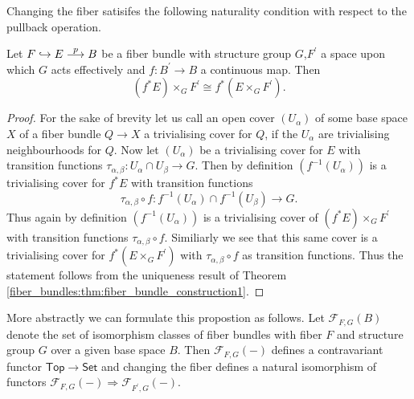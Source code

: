    Changing the fiber satisifes the following naturality condition with respect to the pullback operation. 
    
    \begin{proposition}
        \label{fiber_bundles:prop:natruality_of_changing_fiber}
        Let $F \hookrightarrow E \oset[0.6pt]{\scalebox{0.8}{$p$}}{\longrightarrow} B$ be a fiber bundle with structure group $G$,$F^\prime$ a space upon which $G$ acts effectively and $f \colon B^\prime \to B$ a continuous map. Then 
        \[
        (f^\ast E) \times_G F^\prime \cong f^\ast(E \times_G F^\prime).
        \]
    \end{proposition}

    \begin{proof}
        For the sake of brevity let us call an open cover $(U_\alpha)$ of some base space $X$ of a fiber bundle $Q \to X$ a trivialising cover for $Q$, if the $U_\alpha$ are trivialising neighbourhoods for $Q$. Now let $(U_\alpha)$ be a trivialising cover for $E$ with transition functions $\tau_{\alpha,\beta} \colon U_\alpha \cap U_\beta \to G$. Then by definition $(f^{-1}(U_\alpha))$ is a trivialising cover for $f^\ast E$ with transition functions $$\tau_{\alpha,\beta}\circ f \colon f^{-1}(U_\alpha) \cap f^{-1}(U_\beta) \to G.$$ Thus again by definition $(f^{-1}(U_\alpha))$ is a trivialising cover of $(f^\ast E) \times_G F^\prime$ with transition functions $\tau_{\alpha,\beta}\circ f$. Similiarly we see that this same cover is a trivialising cover for $f^\ast(E \times_G F^\prime)$ with $\tau_{\alpha,\beta}\circ f$ as transition functions. Thus the statement follows from the uniqueness result of Theorem \ref{fiber_bundles:thm:fiber_bundle_construction1}.
    \end{proof}

    More abstractly we can formulate this propostion as follows. Let $\mathcal{F}_{F,G}(B)$ denote the set of isomorphism classes of fiber bundles with fiber $F$ and structure group $G$ over a given base space $B$. Then $\mathcal{F}_{F,G}(-)$ defines a contravariant functor $\mathsf{Top} \to \mathsf{Set}$ and changing the fiber defines a natural isomorphism of functors $\mathcal{F}_{F,G}(-) \Rightarrow \mathcal{F}_{F^\prime,G}(-)$.
